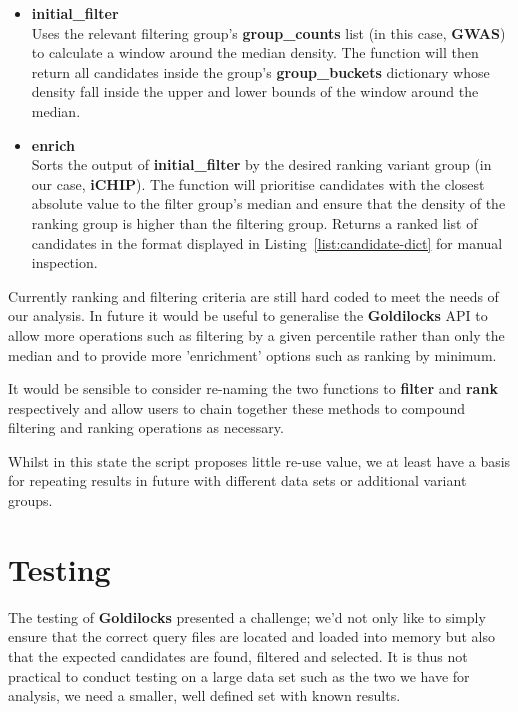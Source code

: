 \begin{itemize}
    \item \textbf{initial\_filter} \hfill\\
        Uses the relevant filtering group's \textbf{group\_counts} list (in this case,
        \textbf{GWAS}) to calculate a window around the median density. The
        function will then return all candidates inside the group's
        \textbf{group\_buckets} dictionary whose density fall inside the upper
        and lower bounds of the window around the median.

    \item \textbf{enrich} \hfill\\
        Sorts the output of \textbf{initial\_filter} by the desired ranking
        variant group (in our case, \textbf{iCHIP}). The function will
        prioritise candidates with the closest absolute value to the filter group's median
        and ensure that the density of the ranking group is higher than the
        filtering group. Returns a ranked list of candidates in the format
        displayed in Listing~\ref{list:candidate-dict} for manual inspection.
\end{itemize}

Currently ranking and filtering criteria are still hard coded to meet the needs
of our analysis.  In future it would be useful to generalise the
\textbf{Goldilocks} API to allow more operations such as filtering by a given
percentile rather than only the median and to provide more 'enrichment' options
such as ranking by minimum.

It would be sensible to consider re-naming the two functions to \textbf{filter}
and \textbf{rank} respectively and allow users to chain together these methods
to compound filtering and ranking operations as necessary.

Whilst in this state the script proposes little re-use value, we at least have a
basis for repeating results in future with different data sets or additional
variant groups.



\section{Testing}

The testing of \textbf{Goldilocks} presented a challenge; we'd not only like
to simply ensure that the correct query files are located and loaded into
memory but also that the expected candidates are found, filtered and selected.
It is thus not practical to conduct testing on a large data set such as the two
we have for analysis, we need a smaller, well defined set with known results.

